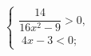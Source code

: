 \begin{ex}[type=ineq_system]
	\begin{condition}
		$\begin{cases} \dfrac{14}{16x^2 - 9}>0 ,\\
			\; 4x - 3<0  ;
		\end{cases}$
	\end{condition}
\end{ex}
